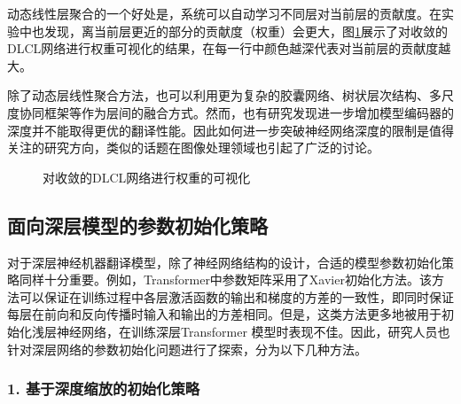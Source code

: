 \parinterval 动态线性层聚合的一个好处是，系统可以自动学习不同层对当前层的贡献度。在实验中也发现，离当前层更近的部分的贡献度（权重）会更大，图\ref{fig:15-14}展示了对收敛的DLCL网络进行权重可视化的结果，在每一行中颜色越深代表对当前层的贡献度越大。

\parinterval 除了动态层线性聚合方法，也可以利用更为复杂的胶囊网络、树状层次结构、多尺度协同框架等作为层间的融合方式。然而，也有研究发现进一步增加模型编码器的深度并不能取得更优的翻译性能。因此如何进一步突破神经网络深度的限制是值得关注的研究方向，类似的话题在图像处理领域也引起了广泛的讨论。

\begin{figure}[htp]
\centering

\caption{对收敛的DLCL网络进行权重的可视化}
\label{fig:15-14}
\end{figure}


\subsection{面向深层模型的参数初始化策略}

\parinterval 对于深层神经机器翻译模型，除了神经网络结构的设计，合适的模型参数初始化策略同样十分重要。例如，Transformer中参数矩阵采用了Xavier初始化方法。该方法可以保证在训练过程中各层激活函数的输出和梯度的方差的一致性，即同时保证每层在前向和反向传播时输入和输出的方差相同。但是，这类方法更多地被用于初始化浅层神经网络，在训练深层Transformer 模型时表现不佳。因此，研究人员也针对深层网络的参数初始化问题进行了探索，分为以下几种方法。


\subsubsection{1. 基于深度缩放的初始化策略}

